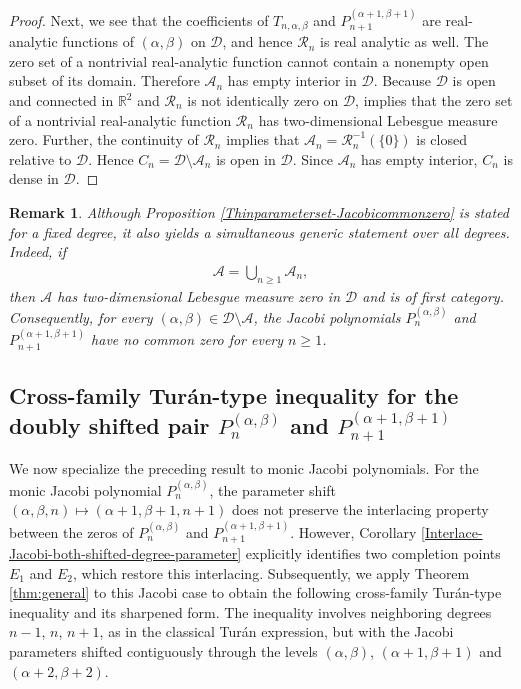 \documentclass[final,3p,times,12pt]{elsarticle}
\newtheorem{remark}{Remark}[section]
\numberwithin{equation}{section}  %
\begin{document}
\begin{proof}
	Next, we see that	the coefficients of $T_{n,\alpha,\beta}$ and
		$P_{n+1}^{(\alpha+1,\beta+1)}$ are real-analytic functions of
		$(\alpha,\beta)$ on $\mathcal{D}$, and hence $\mathcal{R}_n$ is real analytic as well.
		The zero set of a nontrivial real-analytic function cannot contain a
		nonempty open subset of its domain. Therefore $\mathcal{A}_n$ has empty
		interior in $\mathcal{D}$. Because $\mathcal{D}$ is open and connected in $\mathbb{R}^2$ and $\mathcal{R}_n$ is not identically zero on
		$\mathcal{D}$,  \cite[Proposition 1]{Mityagin2020-Zerosetofrealanalytic} implies that the zero set of a nontrivial
		real-analytic function $\mathcal{R}_n$ has two-dimensional Lebesgue measure zero.
		Further, the continuity of $\mathcal{R}_n$ implies that $\mathcal{A}_n=\mathcal{R}_n^{-1}(\{0\})$
		is closed relative to $\mathcal D$. Hence $	C_n	=	\mathcal{ D}\setminus\mathcal{A}_n$	is open in $\mathcal{D}$. Since $\mathcal{A}_n$ has empty interior,
		$C_n$ is dense in $\mathcal{D}$.
	\end{proof}
	
	\begin{remark}
	Although Proposition \ref{Thinparameterset-Jacobicommonzero} is stated for a fixed degree, it also yields
	a simultaneous generic statement over all degrees. Indeed, if
	\begin{align*}
		\mathcal{A}
		=
		\bigcup_{n\geq1}\mathcal{A}_n,
	\end{align*}
then $\mathcal{A}$ has two-dimensional Lebesgue measure zero in
$\mathcal{D}$ and is of first category. Consequently, for every $(\alpha,\beta)\in\mathcal{D}\setminus\mathcal{A}$, the Jacobi polynomials $P_n^{(\alpha,\beta)}$ and $P_{n+1}^{(\alpha+1,\beta+1)}$ have no common zero for every $n\geq 1$.  
\end{remark}
	
	
	
	

\subsection[
Cross-family Turan-type inequality for the doubly shifted pair
Pn(alpha,beta) and P(n+1)(alpha+1,beta+1)
]{
	Cross-family Tur\'an-type inequality for the doubly shifted pair
	$P_n^{(\alpha,\beta)}$ and
	$P_{n+1}^{(\alpha+1,\beta+1)}$
}\label{Turan inequalities}


We now specialize the preceding result to monic Jacobi polynomials. For the monic Jacobi polynomial $P^{(\alpha,\beta)}_n$, the parameter shift $(\alpha,\beta,n)\mapsto(\alpha+1,\beta+1,n+1)$ does not preserve the interlacing property between the zeros of $P_n^{(\alpha,\beta)}$ and $P_{n+1}^{(\alpha+1,\beta+1)}$. However, Corollary \ref{Interlace-Jacobi-both-shifted-degree-parameter} explicitly identifies two completion points $E_1$ and $E_2$, which restore this interlacing. Subsequently, we apply Theorem \ref{thm:general} to this Jacobi case to obtain the following cross-family Tur\'an-type inequality  and its sharpened form. The inequality involves neighboring degrees $n-1$, $n$, $n+1$, as in the classical Tur\'an expression, but with the Jacobi parameters shifted contiguously through the levels $(\alpha,\beta)$, $(\alpha+1,\beta+1)$ and  $(\alpha+2,\beta+2)$.
\end{document}
